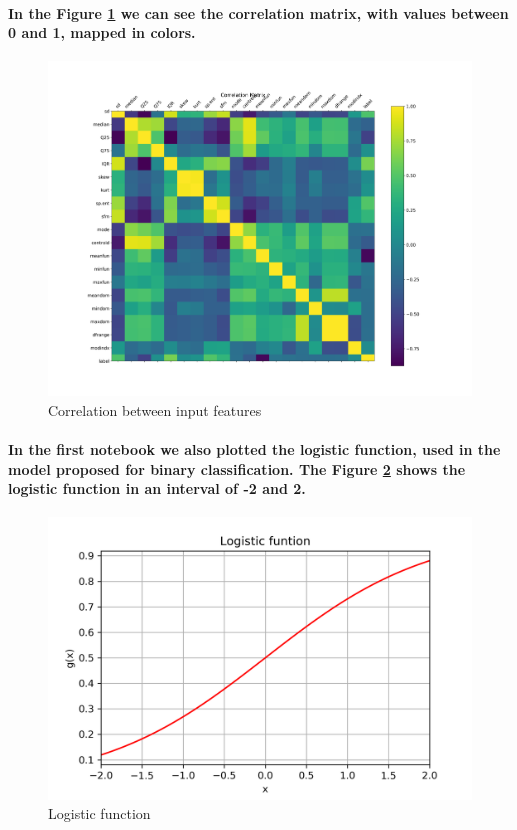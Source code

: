\documentclass[a4paper]{article}    %
\begin{document}
\paragraph{In the Figure \ref{fig:pre-ex1-correlation} we can see the correlation matrix, with values between 0 and 1, mapped in colors.}

\begin{figure}[H]
    \includegraphics[width=15cm]{correlation}
    \caption{Correlation between input features}
    \label{fig:pre-ex1-correlation}
\end{figure}

\paragraph{In the first notebook we also plotted the logistic function, used in the model proposed for binary classification. The Figure \ref{fig:pre-ex1-logistic} shows the logistic function in an interval of -2 and 2.}

\begin{figure}[H]
    \centering
    \includegraphics[width=12cm]{logistic_function}
    \caption{Logistic function}
    \label{fig:pre-ex1-logistic}
\end{figure}
\end{document}
